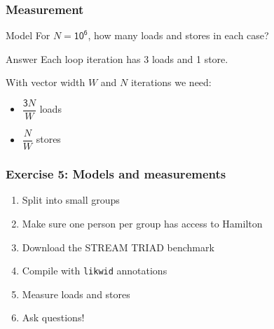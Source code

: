\documentclass[dvipsnames,presentation,aspectratio=169,14pt]{beamer}
\begin{document}
\begin{frame}
  \frametitle{Measurement}
  \begin{challenge}{Model}
    For $N = \mathsf{10^6}$, how many loads and stores in each case?
  \end{challenge}
  \pause
  \begin{answer}{Answer}
    Each loop iteration has 3 loads and 1 store.

    With vector width $W$ and $N$ iterations we need:
    \vskip 4pt
    \begin{itemize}[itemsep=4pt]
    \item $\dfrac{\mathsf 3N}{W}$ loads
    \item $\dfrac{N}{W}$ stores
    \end{itemize}

  \end{answer}
\end{frame}

\begin{frame}[fragile]
  \frametitle{Exercise 5: Models and measurements}
  \begin{enumerate}[itemsep=8pt]
  \item Split into small groups
  \item Make sure one person per group has access to Hamilton
  \item Download the STREAM TRIAD benchmark
  \item Compile with \verb#likwid# annotations
  \item Measure loads and stores
  \item Ask questions!
  \end{enumerate}
\end{frame}
\end{document}
